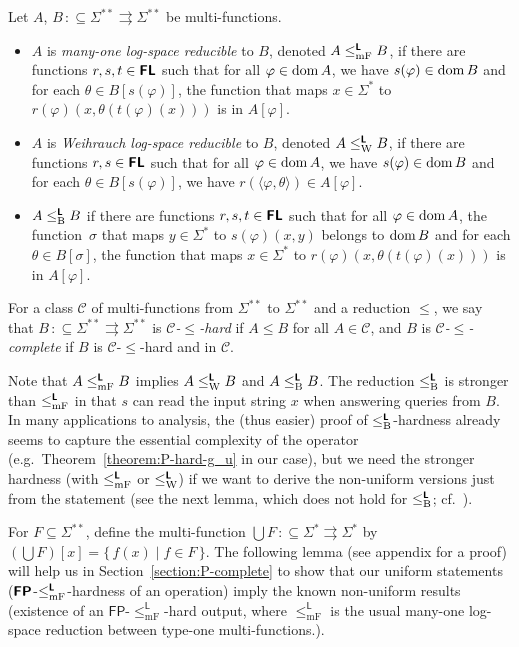 \documentclass[envcountsect,envcountsame,orivec,oribibl]{llncs}
\newcommand{\classonefont}[1]{\mathsf{#1}}
\newcommand{\classL}{\classonefont{L}}
\newcommand{\classFP}{\classonefont{FP}}
\newcommand{\classtwofont}[1]{\text{\bfseries \sffamily \upshape #1}}
\newcommand{\classLtwo}{\classtwofont{L}}
\newcommand{\classFLtwo}{\classtwofont{FL}}
\newcommand{\classFPtwo}{\classtwofont{FP}}
\newcommand{\redW}{\leq _{\mathrm W}}
\newcommand{\redmF}{\leq _{\mathrm{mF}}}
\newcommand{\redB}{\leq _{\mathrm B}}
\newcommand{\redLW}{\redW ^{\classLtwo}}
\newcommand{\redLmF}{\redmF ^{\classLtwo}}
\newcommand{\redLB}{\redB ^{\classLtwo}}
\newcommand{\LM}{\varSigma ^{**}}
\newcommand{\dom}{\mathop{\rm dom}}
\newcommand{\pcolon}{\mathpunct{\,:\subseteq}}
\begin{document}
\begin{definition}
Let $A$, $B \pcolon \LM \rightrightarrows \LM$ be multi-functions.
\begin{itemize}
 \item $A$ is \emph{many-one log-space reducible} to $B$, 
       denoted $A \redLmF B$,
       if there are functions $r, s, t \in \classFLtwo$ such that 
       for all $\varphi \in \dom A$,
       we have $s(\varphi) \in \dom B$ and 
       for each $\theta \in B[s(\varphi)]$, 
       the function that maps $x \in \varSigma^*$ to $r(\varphi)(x, \theta(t(\varphi)(x)))$
       is in $A[\varphi]$.
 \item $A$ is \emph{Weihrauch log-space reducible} to $B$,
       denoted $A \redLW B$,
       if there are functions $r, s \in \classFLtwo$ such that 
       for all $\varphi \in \dom A$,
       we have $s(\varphi) \in \dom B$ and 
       for each $\theta \in B[s(\varphi)]$, 
       we have $r(\langle \varphi, \theta \rangle) \in A[\varphi]$.
 \item $A \redLB B$ 
if there are functions $r, s, t \in \classFLtwo$ such that 
for all $\varphi \in \dom A$,
the function~$\sigma$ that maps $y \in \varSigma ^*$ to $s (\varphi) (x, y)$
belongs to $\dom B$ 
and for each $\theta \in B [\sigma]$, 
the function that maps $x \in \varSigma^*$ 
to $r(\varphi)(x, \theta(t(\varphi)(x)))$ is in $A[\varphi]$.
\end{itemize}
\end{definition}

For a class $\mathcal{C}$ of multi-functions from $\LM$ to $\LM$
and a reduction $\leq$, 
we say that $B \pcolon \LM \rightrightarrows \LM$ is 
\emph{$\mathcal{C}$-$\leq$-hard} if $A \leq B$ for all $A \in \mathcal{C}$,
and $B$ is \emph{$\mathcal{C}$-$\leq$-complete} 
if $B$ is $\mathcal{C}$-$\leq$-hard and in $\mathcal{C}$.

Note that $A \redLmF B$ implies $A \redLW B$ and $A \redLB B$. 
The reduction $\redLB$ is stronger than $\redLmF$ in that 
$s$ can read the input string $x$ when answering queries from $B$.
In many applications to analysis, 
the (thus easier) proof of $\redLB$-hardness 
already seems to capture the essential complexity of the operator
(e.g.~Theorem~\ref{theorem:P-hard-g_u} in our case), 
but we need the stronger hardness (with $\redLmF$ or $\redLW$)
if we want to derive the non-uniform versions just from the statement
(see the next lemma, which does not hold for
$\redLB$; cf.~\cite[Lemma~3.6]{kawamura2012complexity}). 

For $F \subseteq \LM$, 
define the multi-function $\bigcup F \pcolon \varSigma ^* \rightrightarrows \varSigma ^*$ by
$(\bigcup F) [x] = \{\, f(x) \mid f \in F \,\}$.
The following lemma (see appendix for a proof)
will help us in Section~\ref{section:P-complete} to show that 
our uniform statements ($\classFPtwo$-$\redLmF$-hardness of an operation)
imply the known non-uniform results 
\newcommand{\redoneLmF}{\le^\classL_{\mathrm{mF}}}
(existence of an $\classFP$-$\redoneLmF$-hard output, 
where $\redoneLmF$ is the usual many-one log-space reduction 
between type-one multi-functions.). 
\end{document}
